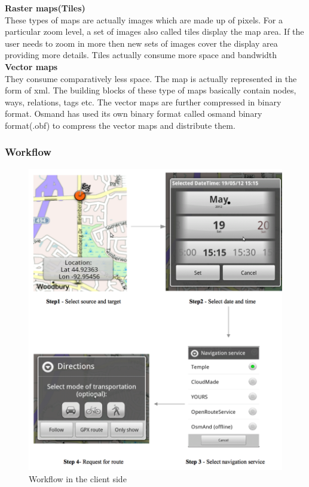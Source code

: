 \documentclass[a4paper,12pt, notitlepage, oneside, onecolumn]{article}
\begin{document}
\textbf{Raster maps(Tiles)}\\
These types of maps are actually images which are made up of pixels. For a particular zoom level, a set of images also called tiles display the map area. If the user needs to zoom in more then new sets of images cover the display area providing more details. Tiles actually consume more space and bandwidth\\

\textbf{Vector maps}\\
They consume comparatively less space. The map is actually represented in the form of xml. The building blocks of these type of maps basically contain nodes, ways, relations, tags etc\cite{openstreetmap_elements}. The vector maps are further compressed in binary format. Osmand has used its own binary format called osmand binary format(.obf)\cite{obf} to compress the vector maps and distribute them.


\subsubsection{Workflow}
\begin{figure}[H]
\begin{minipage}[b]{1.0\linewidth}
\centering
\includegraphics[scale=0.4]{workflow.png}
\caption{Workflow in the client side}
\label{fig:workflow}
\end{minipage}
\centering
\end{figure}
\end{document}
